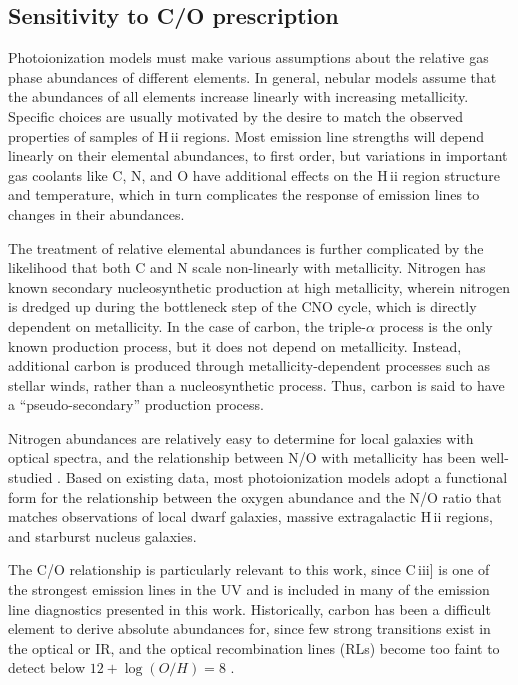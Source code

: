 \documentclass[preprint2]{aastex61}
\newcommand{\hii}{H\,{\sc ii}\xspace}
\newcommand{\ciii}{C\,{\sc iii}]\xspace}
\begin{document}
\subsection{Sensitivity to C/O prescription} \label{sec:gasZ:CO}

Photoionization models must make various assumptions about the relative gas phase abundances of different elements. In general, nebular models assume that the abundances of all elements increase linearly with increasing metallicity. Specific choices are usually motivated by the desire to match the observed properties of samples of \hii regions. Most emission line strengths will depend linearly on their elemental abundances, to first order, but variations in important gas coolants like C, N, and O have additional effects on the \hii region structure and temperature, which in turn complicates the response of emission lines to changes in their abundances.

The treatment of relative elemental abundances is further complicated by the likelihood that both C and N scale non-linearly with metallicity. Nitrogen has known secondary nucleosynthetic production at high metallicity, wherein nitrogen is dredged up during the bottleneck step of the CNO cycle, which is directly dependent on metallicity. In the case of carbon, the triple-$\alpha$ process is the only known production process, but it does not depend on metallicity. Instead, additional carbon is produced through metallicity-dependent processes such as stellar winds, rather than a nucleosynthetic process. Thus, carbon is said to have a ``pseudo-secondary'' production process.

Nitrogen abundances are relatively easy to determine for local galaxies with optical spectra, and the relationship between N/O with metallicity has been well-studied \citep[e.g.,][]{Garnett+1990, vanZee+1998, Berg+2012}. Based on existing data, most photoionization models adopt a functional form for the relationship between the oxygen abundance and the N/O ratio that matches observations of local dwarf galaxies, massive extragalactic \hii regions, and starburst nucleus galaxies.

The C/O relationship is particularly relevant to this work, since \ciii is one of the strongest emission lines in the UV and is included in many of the emission line diagnostics presented in this work. Historically, carbon has been a difficult element to derive absolute abundances for, since few strong transitions exist in the optical or IR, and the optical recombination lines (RLs) become too faint to detect below $12+\log(O/H)=8$ \citep{Esteban+2014}.
\end{document}
